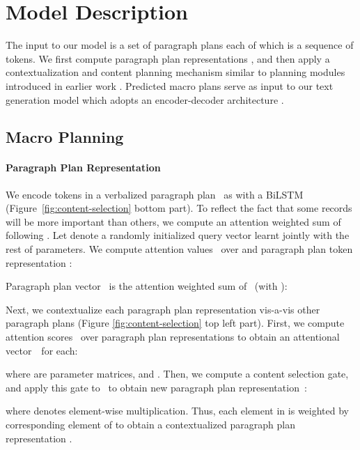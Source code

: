\documentclass[11pt,a4paper]{article}
\begin{document}
\section{Model Description}
\label{sec:model-description}

The input to our model is a set of paragraph plans each of which is a
sequence of tokens. We first compute paragraph plan representations
, and then apply a contextualization and content
planning mechanism similar to planning modules introduced in earlier
work \cite{DBLP:journals/corr/abs-1809-00582,chen-bansal-2018-fast}.
Predicted macro plans serve as input to our text generation model
which adopts an encoder-decoder architecture
\cite{DBLP:journals/corr/BahdanauCB14,luong-etal-2015-effective}.


\subsection{Macro Planning}
\label{sec:cs_planning}


\paragraph{Paragraph Plan Representation}
We encode tokens in a verbalized paragraph plan~ as  with a BiLSTM
(Figure~\ref{fig:content-selection} bottom part).  To reflect the fact
that some records will be more important than others, we compute an
attention weighted sum of 
following \citet{yang-etal-2016-hierarchical}.  Let  denote a randomly initialized query vector learnt
jointly with the rest of
parameters. We compute attention values~ over  and
paragraph plan token representation : 

Paragraph plan vector~ is the attention weighted sum
of~ (with ):



Next, we contextualize each paragraph plan representation vis-a-vis other
paragraph plans (Figure \ref{fig:content-selection} top left part). 
First, we compute attention scores~ over paragraph plan
representations to obtain an attentional vector~~for each:

where 
are parameter matrices, and .
Then, we compute a content selection gate, and apply this gate to~
to obtain new paragraph plan representation~:

where  denotes element-wise multiplication.  Thus, each element
in  is weighted by corresponding element of
 to obtain a contextualized paragraph
plan representation .
\end{document}
